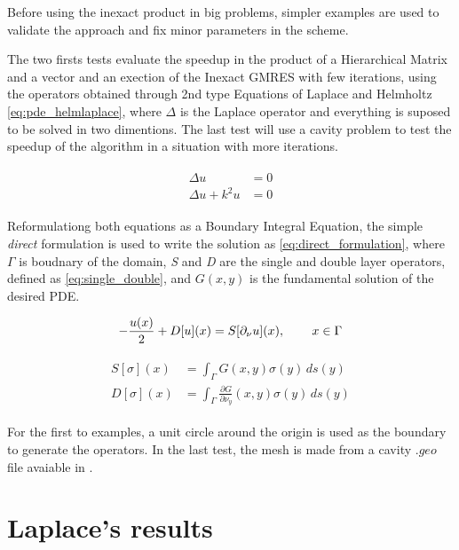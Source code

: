 Before using the inexact product in big problems, simpler examples are used to validate the approach and fix minor parameters in the scheme.

The two firsts tests evaluate the speedup in the product of a Hierarchical Matrix and a vector and an exection of the Inexact GMRES with few iterations, using the operators obtained through 2nd type Equations of Laplace and Helmholtz \ref{eq:pde_helmlaplace}, where $\Delta$ is the Laplace operator and everything is suposed to be solved in two dimentions. The last test will use a cavity problem to test the speedup of the algorithm in a situation with more iterations.

\begin{align}\label{eq:pde_helmlaplace}
    \begin{split}
        \Delta u &= 0 \\
        \Delta u + k^{2}u &= 0
    \end{split}
\end{align}

Reformulationg both equations as a Boundary Integral Equation, the simple \textit{direct} formulation is used to write the solution as \ref{eq:direct_formulation}, where $\Gamma$ is boudnary of the domain, \textit{S} and \textit{D} are the single and double layer operators, defined as \ref{eq:single_double}, and $G(x,y)$ is the fundamental solution of the desired PDE.

\begin{equation}\label{eq:direct_formulation}
    -\frac{u(x)}{2} + D[u](x) = S[\partial_{\nu }u] (x), \hspace{0.3in} x \in \Gamma
\end{equation}

\begin{align}\label{eq:single_double}
    \begin{split}
        S[\sigma](x) &= \int_{\Gamma} G(x,y) \sigma(y)  \,ds(y) \\
        D[\sigma](x) &= \int_{\Gamma} \frac{\partial G}{\partial \nu_{y}}(x,y) \sigma(y)  \,ds(y)
    \end{split}
\end{align}

For the first to examples, a unit circle around the origin is used as the boundary to generate the operators. In the last test, the mesh is made from a cavity $.geo$ file avaiable in \cite{git_dudu}.

\section{Laplace's results}

